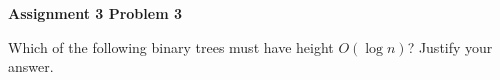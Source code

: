 \documentclass[12pt]{article}
\begin{document}
	
	\begin{center}
		{\Large\bf Assignment 3 Problem 3}\\
		\vspace{3mm}
	\end{center}
	
	\def\question#1{\item[\bf #1.]}
	\def\part#1{\item[\bf #1)]}
	\newcommand{\pc}[1]{\mbox{\textbf{#1}}} %
	
	
	
	
	Which of the following binary trees must have height $O(\log n)$?  Justify your answer.
	
\end{document}

